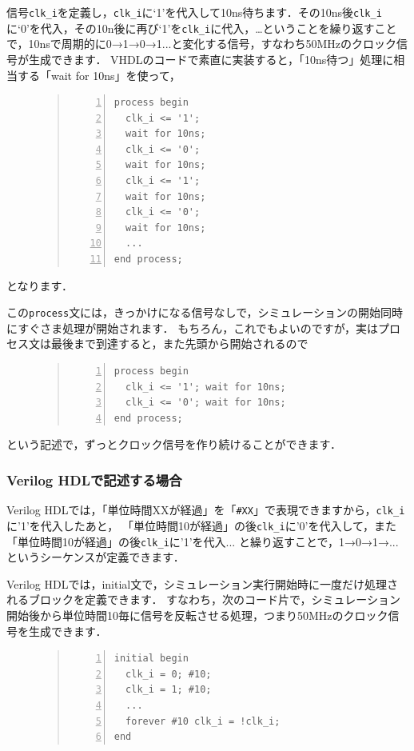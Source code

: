 \documentclass[a4paper,dvipdfmx]{jsarticle}
\begin{document}
信号\verb|clk_i|を定義し，\verb|clk_i|に‘1’を代入して10ns待ちます．その10ns後\verb|clk_i|に‘0’を代入，その10n後に再び‘1’を\verb|clk_i|に代入，…ということを繰り返すことで，10nsで周期的に0→1→0→1...と変化する信号，すなわち50MHzのクロック信号が生成できます．
VHDLのコードで素直に実装すると，「10ns待つ」処理に相当する「wait for 10ns」を使って，
\begin{figure}[H]
\begin{quote}
\begin{Verbatim}[frame=single, numbers=left, baselinestretch=0.8]
process begin
  clk_i <= '1';
  wait for 10ns;
  clk_i <= '0';
  wait for 10ns;
  clk_i <= '1';
  wait for 10ns;
  clk_i <= '0';
  wait for 10ns;
  ...
end process;
\end{Verbatim}
\end{quote}
\end{figure}
となります．

この\verb|process|文には，きっかけになる信号なしで，シミュレーションの開始同時にすぐさま処理が開始されます．
もちろん，これでもよいのですが，実はプロセス文は最後まで到達すると，また先頭から開始されるので
\begin{figure}[H]
\begin{quote}
\begin{Verbatim}[frame=single, numbers=left, baselinestretch=0.8]
process begin
  clk_i <= '1'; wait for 10ns;
  clk_i <= '0'; wait for 10ns;
end process;
\end{Verbatim}
\end{quote}
\end{figure}
という記述で，ずっとクロック信号を作り続けることができます．

\subsubsection{Verilog HDLで記述する場合}
Verilog HDLでは，「単位時間XXが経過」を「\verb|#XX|」で表現できますから，\verb|clk_i|に'1'を代入したあと，
「単位時間10が経過」の後\verb|clk_i|に'0'を代入して，また「単位時間10が経過」の後\verb|clk_i|に'1'を代入...
と繰り返すことで，1→0→1→...というシーケンスが定義できます．

Verilog HDLでは，initial文で，シミュレーション実行開始時に一度だけ処理されるブロックを定義できます．
すなわち，次のコード片で，シミュレーション開始後から単位時間10毎に信号を反転させる処理，つまり50MHzのクロック信号を生成できます．
\begin{figure}[H]
\begin{quote}
\begin{Verbatim}[frame=single, numbers=left, baselinestretch=0.8]
initial begin
  clk_i = 0; #10;
  clk_i = 1; #10;
  ...
  forever #10 clk_i = !clk_i;
end
\end{Verbatim}
\end{quote}
\end{figure}
\end{document}
